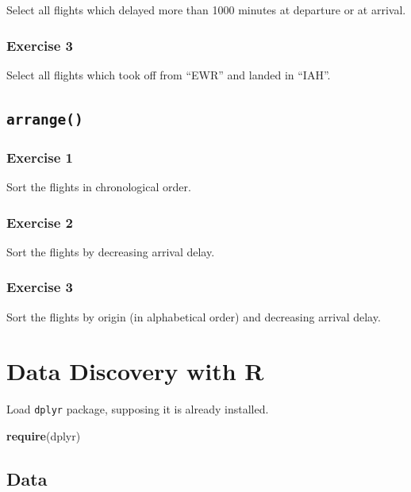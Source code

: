 \documentclass[]{book}
\newenvironment{Shaded}{\begin{snugshade}}{\end{snugshade}}
\newcommand{\KeywordTok}[1]{\textcolor[rgb]{0.13,0.29,0.53}{\textbf{{#1}}}}
\newcommand{\NormalTok}[1]{{#1}}
\begin{document}
Select all flights which delayed more than 1000 minutes at departure or
at arrival.

\subsection{Exercise 3}\label{exercise-3-1}

Select all flights which took off from ``EWR'' and landed in ``IAH''.

\section{\texorpdfstring{\texttt{arrange()}}{arrange()}}\label{arrange}

\subsection{Exercise 1}\label{exercise-1-10}

Sort the flights in chronological order.

\subsection{Exercise 2}\label{exercise-2-5}

Sort the flights by decreasing arrival delay.

\subsection{Exercise 3}\label{exercise-3-2}

Sort the flights by origin (in alphabetical order) and decreasing
arrival delay.

\chapter{Data Discovery with R}\label{data-discovery-with-r}

Load \texttt{dplyr} package, supposing it is already installed.

\begin{Shaded}
\begin{Highlighting}[]
\KeywordTok{require}\NormalTok{(dplyr)}
\end{Highlighting}
\end{Shaded}

\section{Data}\label{data-1}
\end{document}
